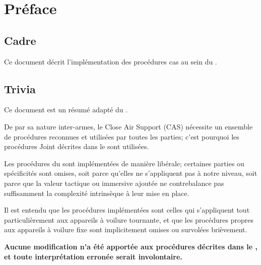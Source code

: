 \thispagestyle{default}



\section*{Préface}

\subsection*{Cadre}

Ce document décrit l'implémentation des procédures \acrfull{cas} au sein du \rgt{}.

\subsection*{Trivia}

Ce document est un résumé adapté du \jp{}.

De par sa nature inter-armes, le Close Air Support (CAS) nécessite un ensemble de procédures reconnues et utilisées par toutes les parties; c'est pourquoi les procédures Joint décrites dans le \jp{} sont utilisées.

Les procédures du \jp{} sont implémentées de manière libérale; certaines parties ou spécificités sont omises, soit parce qu'elles ne s'appliquent pas à notre niveau, soit parce que la valeur tactique ou immersive ajoutée ne contrebalance pas suffisamment la complexité intrinsèque à leur mise en place.

Il est entendu que les procédures implémentées sont celles qui s'appliquent tout particulièrement aux appareils à voilure tournante, et que les procédures propres aux appareils à voilure fixe sont implicitement omises ou survolées brièvement.

\textbf{Aucune modification n'a été apportée aux procédures décrites dans le \jp{}, et toute interprétation erronée serait involontaire.}